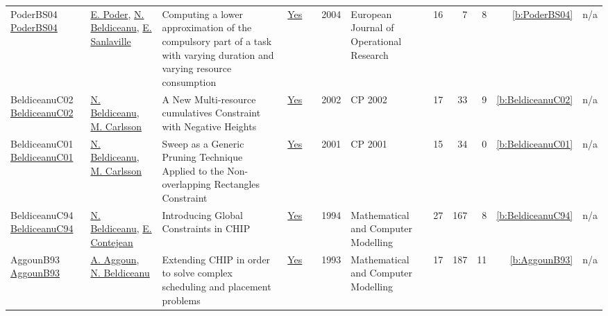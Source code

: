 {\begin{longtable}{>{\raggedright\arraybackslash}p{3cm}>{\raggedright\arraybackslash}p{6cm}>{\raggedright\arraybackslash}p{6.5cm}rrrp{2.5cm}rrrrr}
PoderBS04 \href{https://doi.org/10.1016/S0377-2217(02)00756-7}{PoderBS04} & \hyperref[auth:a361]{E. Poder}, \hyperref[auth:a129]{N. Beldiceanu}, \hyperref[auth:a719]{E. Sanlaville} & Computing a lower approximation of the compulsory part of a task with varying duration and varying resource consumption & \href{../works/PoderBS04.pdf}{Yes} & \cite{PoderBS04} & 2004 & European Journal of Operational Research & 16 & 7 & 8 & \ref{b:PoderBS04} & n/a\\
BeldiceanuC02 \href{https://doi.org/10.1007/3-540-46135-3_5}{BeldiceanuC02} & \hyperref[auth:a129]{N. Beldiceanu}, \hyperref[auth:a91]{M. Carlsson} & A New Multi-resource cumulatives Constraint with Negative Heights & \href{../works/BeldiceanuC02.pdf}{Yes} & \cite{BeldiceanuC02} & 2002 & CP 2002 & 17 & 33 & 9 & \ref{b:BeldiceanuC02} & n/a\\
BeldiceanuC01 \href{https://doi.org/10.1007/3-540-45578-7_26}{BeldiceanuC01} & \hyperref[auth:a129]{N. Beldiceanu}, \hyperref[auth:a91]{M. Carlsson} & Sweep as a Generic Pruning Technique Applied to the Non-overlapping Rectangles Constraint & \href{../works/BeldiceanuC01.pdf}{Yes} & \cite{BeldiceanuC01} & 2001 & CP 2001 & 15 & 34 & 0 & \ref{b:BeldiceanuC01} & n/a\\
BeldiceanuC94 \href{https://www.sciencedirect.com/science/article/pii/0895717794901279}{BeldiceanuC94} & \hyperref[auth:a129]{N. Beldiceanu}, \hyperref[auth:a790]{E. Contejean} & Introducing Global Constraints in {CHIP} & \href{../works/BeldiceanuC94.pdf}{Yes} & \cite{BeldiceanuC94} & 1994 & Mathematical and Computer Modelling & 27 & 167 & 8 & \ref{b:BeldiceanuC94} & n/a\\
AggounB93 \href{https://www.sciencedirect.com/science/article/pii/089571779390068A}{AggounB93} & \hyperref[auth:a731]{A. Aggoun}, \hyperref[auth:a129]{N. Beldiceanu} & Extending {CHIP} in order to solve complex scheduling and placement problems & \href{../works/AggounB93.pdf}{Yes} & \cite{AggounB93} & 1993 & Mathematical and Computer Modelling & 17 & 187 & 11 & \ref{b:AggounB93} & n/a\\
\end{longtable}
}

\clearpage
